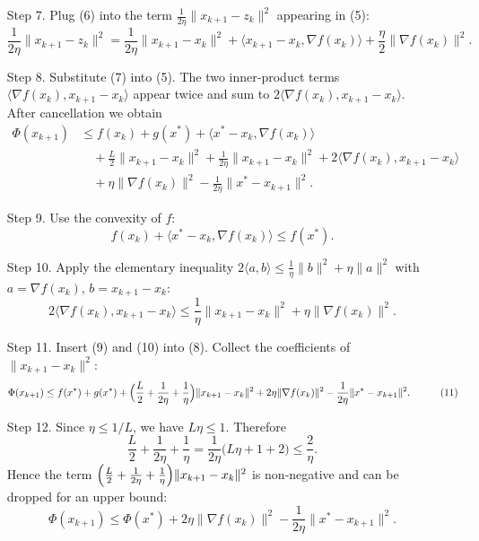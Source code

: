 \documentclass{article}
\begin{document}
\begin{enumerate}
\item[Step 7.] Plug (6) into the term $\frac{1}{2\eta}\|x_{k+1}-z_{k}\|^{2}$ appearing in (5):
\[
\frac{1}{2\eta}\|x_{k+1}-z_{k}\|^{2}
= \frac{1}{2\eta}\|x_{k+1}-x_{k}\|^{2}
+\langle x_{k+1}-x_{k},\nabla f(x_{k})\rangle
+\frac{\eta}{2}\|\nabla f(x_{k})\|^{2}.
\tag{7}
\]

\item[Step 8.] Substitute (7) into (5). The two inner‑product terms $\langle\nabla f(x_{k}),x_{k+1}-x_{k}\rangle$ appear twice and sum to $2\langle\nabla f(x_{k}),x_{k+1}-x_{k}\rangle$.
After cancellation we obtain
\[
\begin{aligned}
\Phi(x_{k+1}) &\le f(x_{k})+g(x^{*})+\langle x^{*}-x_{k},\nabla f(x_{k})\rangle
\\
&\quad +\frac{L}{2}\|x_{k+1}-x_{k}\|^{2}
+\frac{1}{2\eta}\|x_{k+1}-x_{k}\|^{2}
+2\langle\nabla f(x_{k}),x_{k+1}-x_{k}\rangle
\\
&\quad +\eta\|\nabla f(x_{k})\|^{2}
-\frac{1}{2\eta}\|x^{*}-x_{k+1}\|^{2}.
\end{aligned}
\tag{8}
\]

\item[Step 9.] Use the convexity of $f$:
\[
f(x_{k})+ \langle x^{*}-x_{k},\nabla f(x_{k})\rangle \le f(x^{*}).
\tag{9}
\]

\item[Step 10.] Apply the elementary inequality $2\langle a,b\rangle\le \frac{1}{\eta}\|b\|^{2}+\eta\|a\|^{2}$ with $a=\nabla f(x_{k})$, $b=x_{k+1}-x_{k}$:
\[
2\langle\nabla f(x_{k}),x_{k+1}-x_{k}\rangle
\le \frac{1}{\eta}\|x_{k+1}-x_{k}\|^{2}+\eta\|\nabla f(x_{k})\|^{2}.
\tag{10}
\]

\item[Step 11.] Insert (9) and (10) into (8). Collect the coefficients of $\|x_{k+1}-x_{k}\|^{2}$:
\[
\begin{aligned}
\Phi(x_{k+1})
&\le f(x^{*})+g(x^{*})
+\Bigl(\frac{L}{2}+\frac{1}{2\eta}+\frac{1}{\eta}\Bigr)\|x_{k+1}-x_{k}\|^{2}
+2\eta\|\nabla f(x_{k})\|^{2}
-\frac{1}{2\eta}\|x^{*}-x_{k+1}\|^{2}.
\end{aligned}
\tag{11}
\]

\item[Step 12.] Since $\eta\le 1/L$, we have $L\eta\le1$. Therefore
\[
\frac{L}{2}+\frac{1}{2\eta}+\frac{1}{\eta}
= \frac{1}{2\eta}\bigl(L\eta+1+2\bigr)
\le \frac{2}{\eta}.
\tag{12}
\]
Hence the term $\Bigl(\frac{L}{2}+\frac{1}{2\eta}+\frac{1}{\eta}\Bigr)\|x_{k+1}-x_{k}\|^{2}$ is non‑negative and can be dropped for an upper bound:
\[
\Phi(x_{k+1})\le \Phi(x^{*})+2\eta\|\nabla f(x_{k})\|^{2}
-\frac{1}{2\eta}\|x^{*}-x_{k+1}\|^{2}.
\tag{13}
\]


\end{enumerate}
\end{document}
